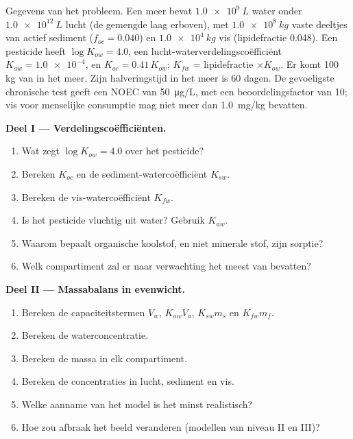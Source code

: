 \begin{problem}
\label{pb:b3:environmental-toxicology:1}
Gegevens van het probleem. Een meer bevat $\qty{1.0e9}{L}$ water onder $\qty{1.0e12}{L}$ lucht (de gemengde laag erboven),
met $\qty{1.0e8}{kg}$ vaste deeltjes van actief sediment ($f_{oc} = 0.040$) en $\qty{1.0e4}{kg}$ vis (lipidefractie 0.048).
Een pesticide heeft $\log K_{ow} = 4.0$, een lucht-waterverdelingscoëfficiënt $K_{aw} = \num{1.0e-4}$, en $K_{oc} = 0.41\,K_{ow}$;
$K_{fw}$ = lipidefractie $\times K_{ow}$. Er komt 100 kg van in het meer. Zijn halveringstijd in het meer is 60 dagen.
De gevoeligste chronische test geeft een NOEC van \qty{50}{\micro g/L}, met een beoordelingsfactor van 10;
vis voor menselijke consumptie mag niet meer dan \qty{1.0}{mg/kg} bevatten.

\medskip\noindent\textbf{Deel I --- Verdelingscoëfficiënten.}
\begin{enumerate}
  \item Wat zegt $\log K_{ow} = 4.0$ over het pesticide?
  \item Bereken $K_{oc}$ en de sediment-watercoëfficiënt $K_{sw}$.
  \item Bereken de vis-watercoëfficiënt $K_{fw}$.
  \item Is het pesticide vluchtig uit water? Gebruik $K_{aw}$.
  \item Waarom bepaalt organische koolstof, en niet minerale stof, zijn
        sorptie?
  \item Welk compartiment zal er naar verwachting het meest van bevatten?
\end{enumerate}

\medskip\noindent\textbf{Deel II --- Massabalans in evenwicht.}
\begin{enumerate}[resume]
  \item Bereken de capaciteitstermen $V_w$, $K_{aw}V_a$, $K_{sw}m_s$ en $K_{fw}m_f$.
  \item Bereken de waterconcentratie.
  \item Bereken de massa in elk compartiment.
  \item Bereken de concentraties in lucht, sediment en vis.
  \item Welke aanname van het model is het minst realistisch?
  \item Hoe zou afbraak het beeld veranderen (modellen van niveau II en
        III)?
\end{enumerate}


\end{problem}
